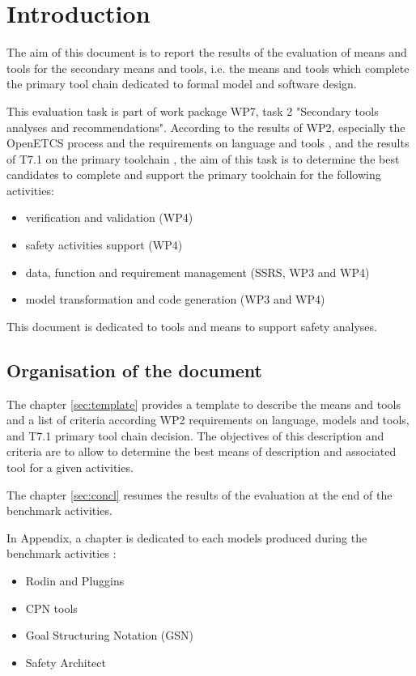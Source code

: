 

\chapter{Introduction}
\label{sec:intro}

The aim of this document is to report the results of the evaluation of means and tools for the secondary means and tools, i.e. the means and tools which complete the primary tool chain dedicated to formal model and software design.

This evaluation task is part of work package WP7, task 2 "Secondary  tools analyses and recommendations". According to the results of WP2, especially the OpenETCS process and the
requirements on language and tools \citep{D2_6}, and the results of T7.1 on the primary toolchain \citep{D7.1},  the aim of this task is to determine the best candidates to complete and support the primary toolchain for the following activities:

\begin{itemize}
\item verification and  validation (WP4)
\item safety activities support (WP4)
\item data, function and requirement management (SSRS, WP3 and WP4)
\item model transformation and code generation (WP3 and WP4)
\end{itemize}

This document is dedicated to tools and means to support safety analyses.

\section{Organisation of the document}

The chapter  \ref{sec:template} provides a template to describe the means and tools and a list
of criteria according WP2 requirements on language, models and tools, and T7.1 primary tool chain decision. The objectives of this
description and criteria are to allow to determine the best means of description and associated
tool for a given activities.


The chapter \ref{sec:concl} resumes the results of the evaluation at the end of the benchmark activities.

In Appendix, a chapter is dedicated to each models produced during the benchmark activities :

\begin{itemize}
\item Rodin and Pluggins
\item CPN tools
\item Goal Structuring Notation (GSN)
\item Safety Architect
\end{itemize}


